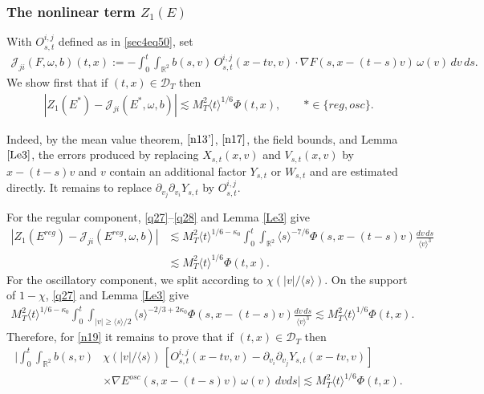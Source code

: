 \documentclass[reqno,11pt]{amsart}
\numberwithin{equation}{section}
\def\R{{\mathbb R}}
\def\R{{\bf R}}
\def\R{\mathbb{R}}
\begin{document}
\subsubsection{The nonlinear term $Z_1(E)$} With $O^{i,j}_{s,t}$ defined as in \eqref{sec4eq50}, set
\begin{align*}
\mathcal J_{ji}(F,\omega,b)(t,x)
:=-\int_0^t\!\!\int_{\R^2} b(s,v)\,
O_{s,t}^{i,j}(x-tv,v)\cdot\nabla F(s,x-(t-s)v)\,\omega(v)\,dv\,ds.
\end{align*}
We show first that if $(t,x)\in\mathcal{D}_T$ then
\begin{align}\label{n19}
\left|Z_1(E^*)-\mathcal J_{ji}(E^*,\omega,b)\right|
\lesssim M_T^2\langle t\rangle^{1/6}\Phi(t,x),
\qquad *\in\{reg,osc\}.
\end{align}

Indeed, by the mean value theorem, \(\eqref{n13'}\), \(\eqref{n17}\), the field bounds, and Lemma \(\ref{Le3}\), the errors produced by replacing  $X_{s,t}(x,v)$ and $V_{s,t}(x,v)$ by $x-(t-s)v$ and $v$ contain an additional factor $Y_{s,t}$ or $W_{s,t}$ and
are estimated directly. It remains to replace
$\partial_{v_j}\partial_{v_i}Y_{s,t}$ by $O_{s,t}^{i,j}$.

For the regular component, \eqref{q27}--\eqref{q28} and Lemma \ref{Le3} give
\begin{align*}
\left|Z_1(E^{reg})-\mathcal J_{ji}(E^{reg},\omega,b)\right|
&\lesssim M_T^2\langle t\rangle^{1/6-\kappa_0}\!\!\int_0^t\int_{\R^2}
\langle s\rangle^{-7/6}\Phi(s,x-(t-s)v)
\frac{dv\,ds}{\langle v\rangle^3}\\
&\lesssim M_T^2\langle t\rangle^{1/6}\Phi(t,x).
\end{align*}
For the oscillatory component, we split according to
$\chi(|v|/\langle s\rangle)$. On the support of $1-\chi$,
\eqref{q27} and Lemma \ref{Le3} give
\begin{align*}
M_T^2\langle t\rangle^{1/6-\kappa_0}
\int_0^t\!\!\int_{|v|\geq\langle s\rangle/2}
\langle s\rangle^{-2/3+2\kappa_0}
\Phi(s,x-(t-s)v)\frac{dv\,ds}{\langle v\rangle^3}
\lesssim M_T^2\langle t\rangle^{1/6}\Phi(t,x).
\end{align*}
Therefore, for \eqref{n19} it remains to prove that if $(t,x)\in\mathcal{D}_T$ then
\begin{equation}\label{n19.2}
\begin{split}
\Big|\int_0^t\!\!\int_{\R^2} b(s,v)&\chi(|v|/\langle s\rangle)\,[O_{s,t}^{i,j}(x-tv,v)-\partial_{v_i}\partial_{v_j}Y_{s,t}(x-tv,v)]\\
&\times\nabla E^{osc}(s,x-(t-s)v)\,\omega(v)\,dvds\Big|\lesssim M_T^2\langle t\rangle^{1/6}\Phi(t,x).
\end{split}
\end{equation}
\end{document}
